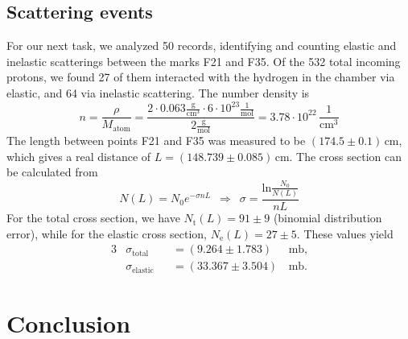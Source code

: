 \documentclass[twocolumn]{article}
\begin{document}
\subsection{Scattering events}
For our next task, we analyzed 50 records, identifying and counting elastic and inelastic scatterings between the marks F21 and F35. Of the 532 total incoming protons, we found 27 of them interacted with the hydrogen in the chamber via elastic, and 64 via inelastic scattering. The number density is
\begin{equation}
n = \frac{\rho}{M_{\text{atom}}} = \frac{2 \cdot 0.063 \frac{\text{g}}{\text{cm}^3} \cdot 6 \cdot 10^{23} \frac{1}{\text{mol}}}{2 \frac{\text{g}}{\text{mol}}} = 3.78 \cdot 10^{22} \, \frac{1}{\text{cm}^3} \nonumber
\end{equation}
The length between points F21 and F35 was measured to be $(174.5 \pm 0.1)\,$cm, which gives a real distance of $L=(148.739 \pm 0.085)\,$cm. The cross section can be calculated from
\begin{equation}
N(L) = N_0 e^{- \sigma n L} \hspace{6pt} \Longrightarrow \hspace{6pt} \sigma =  \frac{\text{ln} \frac{N_0}{N(L)} }{n L}  \nonumber
\end{equation}
For the total cross section, we have %
$N_{\text{t}}(L) = 91 \pm 9$ (binomial distribution error), while for the elastic cross section, $N_{\text{e}}(L) = 27 \pm 5$. These values yield
\begin{alignat*}{3}
&\sigma_{\text{total}} &&= (9.264 \pm 1.783) \, &\text{mb,}\\
&\sigma_{\text{elastic}} &&= (33.367 \pm 3.504) \, &\text{mb.} 
\end{alignat*}

\section{Conclusion}
\end{document}

